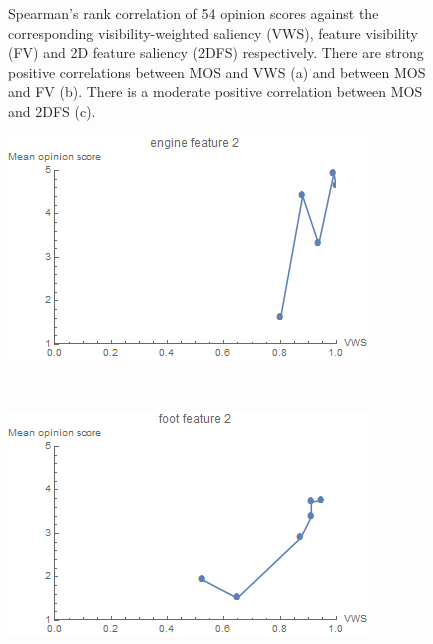 \begin{figure}
\begin{minipage}{.33\textwidth}
	\end{minipage}
	\caption[Spearman's rank correlation of 54 opinion scores against the corresponding visibility-weighted saliency (VWS), feature visibility (FV) and 2D feature saliency (2DFS) respectively.]{Spearman's rank correlation of 54 opinion scores against the corresponding visibility-weighted saliency (VWS), feature visibility (FV) and 2D feature saliency (2DFS) respectively. There are strong positive correlations between MOS and VWS (a) and between MOS and FV (b). There is a moderate positive correlation between MOS and 2DFS (c).}
	\label{fig:mos_vs_vws}
\end{figure}

\begin{figure}
	\centering
	\begin{minipage}{.24\textwidth}
		\includegraphics[width=1\linewidth]{images/mos_vs_metric_engine_feature_2}
		\subcaption{}
	\end{minipage}~
	\begin{minipage}{.24\textwidth}
		\includegraphics[width=1\linewidth]{images/mos_vs_metric_foot_feature_2}

\end{minipage}
\end{figure}

